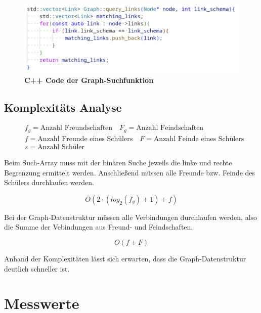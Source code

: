 \documentclass[11pt,a4paper]{article}
\begin{document}
\vspace*{0.5cm}

\begin{figure}[H]
    \centering
    \includegraphics[width=1.0\textwidth]{./res/code_graphdb.png}
    \caption{\textbf{C++ Code der Graph-Suchfunktion}}
\end{figure}

\subsection{Komplexitäts Analyse}

\begin{align*}
    & f_g = \text{Anzahl Freundschaften} \quad
    F_g = \text{Anzahl Feindschaften} \\ 
    & f = \text{Anzahl Freunde eines Schülers} \quad
    F = \text{Anzahl Feinde eines Schülers} \\
    & s = \text{Anzahl Schüler} \quad
\end{align*}

Beim Such-Array muss mit der binären Suche jeweils die linke und rechte Begrenzung
ermittelt werden. Anschließend müssen alle Freunde bzw. Feinde des
Schülers durchlaufen werden.

\begin{equation*}
    O(2 \cdot ( log_2(f_g) + 1 ) + f)
\end{equation*}

Bei der Graph-Datenstruktur müssen alle Verbindungen durchlaufen werden, also
die Summe der Vebindungen aus Freund- und Feindschaften.

\begin{equation*}
    O(f + F)
\end{equation*}

Anhand der Komplexitäten lässt sich erwarten, dass die Graph-Datenstruktur deutlich
schneller ist.

\section{Messwerte}
\end{document}

